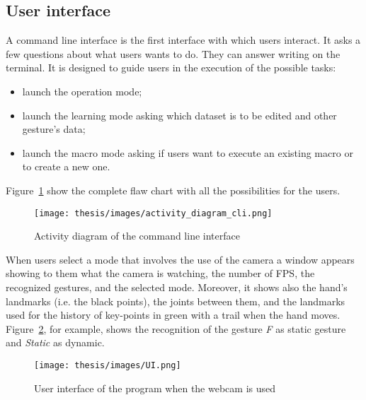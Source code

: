 \documentclass[../thesis.tex]{subfiles}
\begin{document}
\subsection{User interface}
A command line interface is the first interface with which users interact. It asks a few questions about what users wants to do. They can answer writing on the terminal. It is designed to guide users in the execution of the possible tasks:
\begin{itemize}
    \item launch the operation mode;
    \item launch the learning mode asking which dataset is to be edited and other gesture's data;
    \item launch the macro mode asking if users want to execute an existing macro or to create a new one.
\end{itemize}
Figure~\ref{fig:activity_diagram_cli} show the complete flaw chart with all the possibilities for the users.
\begin{figure}[H]
    \centering
    \texttt{[image: thesis/images/activity\_diagram\_cli.png]}
    \caption{Activity diagram of the command line interface}
    \label{fig:activity_diagram_cli}
\end{figure}

When users select a mode that involves the use of the camera a window appears showing to them what the camera is watching, the number of FPS, the recognized gestures, and the selected mode. Moreover, it shows also the hand's landmarks (i.e. the black points), the joints between them, and the landmarks used for the history of key-points in green with a trail when the hand moves. Figure~\ref{fig:example_ui}, for example, shows the recognition of the gesture \textit{F} as static gesture and \textit{Static} as dynamic.

\begin{figure}
    \centering
    \texttt{[image: thesis/images/UI.png]}
    \caption{User interface of the program when the webcam is used}
    \label{fig:example_ui}
\end{figure}
\end{document}
